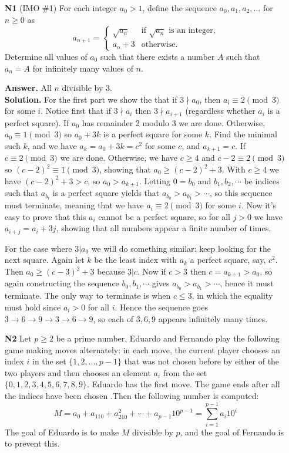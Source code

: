 \documentclass[11pt,a4paper]{article}
\begin{document}
\begin{enumerate}
	\item[\textbf{N1}](IMO \#1) For each integer $a_0 > 1$, define the sequence $a_0, a_1, a_2, \ldots$ for $n \geq 0$ as
	$$a_{n+1} = 
	\begin{cases}
	\sqrt{a_n} & \text{if } \sqrt{a_n} \text{ is an integer,} \\
	a_n + 3 & \text{otherwise.}
	\end{cases}
	$$Determine all values of $a_0$ such that there exists a number $A$ such that $a_n = A$ for infinitely many values of $n$.
	
	\textbf{Answer.} All $n$ divisible by 3. \\
	\textbf{Solution.} 
	For the first part we show the that if $3\nmid a_0$, then $a_i\equiv 2\pmod{3}$ for some $i$. Notice first that if $3\nmid a_i$ then $3\nmid a_{i+1}$ (regardless whether $a_i$ is a perfect square). If $a_0$ has remainder 2 modulo 3 we are done. Otherwise, $a_0\equiv 1\pmod{3}$ so $a_0+3k$ is a perfect square for some $k$. Find the minimal such $k$, and we have $a_k=a_0+3k=c^2$ for some $c$, and $a_{k+1}=c$. If $c\equiv 2\pmod{3}$ we are done. Otherwise, we have $c\ge 4$ and $c-2\equiv 2\pmod{3}$ so $(c-2)^2\equiv 1\pmod{3}$, showing that $a_0\ge (c-2)^2+3$. With $c\ge 4$ we have $(c-2)^2+3 > c$, so $a_0>a_{k+1}$. Letting $0=b_0$ and $b_1, b_2, \cdots$ be indices such that $a_{b_i}$ is a perfect square yields that $a_{b_0}>a_{b_1}>\cdots$, so this sequence must terminate, meaning that we have $a_i\equiv 2\pmod{3}$ for some $i$. Now it's easy to prove that this $a_i$ cannot be a perfect square, so for all $j>0$ we have $a_{i+j}=a_i+3j$, showing that all numbers appear a finite number of times. 
	
	For the case where $3|a_0$ we will do something similar: keep looking for the next square. Again let $k$ be the least index with $a_k$ a perfect square, say, $c^2$. Then $a_0\ge (c-3)^2+3$ because $3|c$. Now if $c>3$ then $c=a_{k+1}>a_0$, so again constructing the sequence $b_0, b_1, \cdots$ gives $a_{b_0}>a_{b_1}>\cdots$, hence it must terminate. The only way to terminate is when $c\le 3$, in which the equality must hold since $a_i>0$ for all $i$. Hence the sequence goes $3\to 6\to 9\to 3\to 6\to 9$, so each of $3, 6, 9$ appears infinitely many times. 
	
	\item[\textbf{N2}]Let $ p \geq 2$ be a prime number. Eduardo and Fernando play the following game making moves alternately: in each move, the current player chooses an index $i$ in the set $\{1,2,\ldots, p-1 \}$ that was not chosen before by either of the two players and then chooses an element $a_i$ from the set $\{0,1,2,3,4,5,6,7,8,9\}$. Eduardo has the first move. The game ends after all the indices have been chosen .Then the following number is computed:
	$$M=a_0+a_110+a_210^2+\cdots+a_{p-1}10^{p-1}= \sum_{i=1}^{p-1}a_i10^i$$
	The goal of Eduardo is to make  $M$ divisible by $p$, and the goal of Fernando is to prevent this.
	

\end{enumerate}
\end{document}
